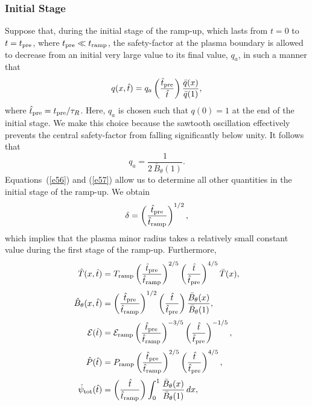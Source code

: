 \documentclass[12pt,prb,aps]{revtex4-1}
\begin{document}
\subsubsection{Initial Stage}\label{init}
Suppose that, during the initial stage of the ramp-up, which lasts from $t=0$ to $t=t_{\rm pre}$, where $t_{\rm pre}\ll t_{\rm ramp}$, 
the safety-factor at the plasma boundary is allowed to decrease from an initial very large value to its final value, $q_a$, in such a manner that
\begin{equation}\label{e57}
q(x,\hat{t}) = q_a\left(\frac{\hat{t}_{\rm pre}}{\hat{t}}\right)\frac{\bar{q}(x)}{\bar{q}(1)},
\end{equation}
where $\hat{t}_{\rm pre}= t_{\rm pre}/\tau_R$. Here, $q_a$ is chosen such that $q(0)=1$ at the end of the initial stage. We make this choice because the
sawtooth oscillation effectively prevents the central safety-factor from falling significantly below unity.\cite{book} It follows that
\begin{equation}
q_a = \frac{1}{2\,\bar{B}_\theta(1)}.
\end{equation}
Equations~(\ref{e56}) and (\ref{e57}) allow us to determine all other quantities in the initial
stage of the ramp-up. We obtain
\begin{equation}
\delta = \left(\frac{\hat{t}_{\rm pre}}{\hat{t}_{\rm ramp}}\right)^{1/2},
\end{equation}
which implies that the plasma minor radius takes a relatively small constant value during the first stage of the ramp-up. 
Furthermore,
\begin{align}
\hat{T}(x,\hat{t}) &= T_{\rm ramp}\left(\frac{\hat{t}_{\rm pre}}{\hat{t}_{\rm ramp}}\right)^{2/5}\left(\frac{\hat{t}}{\hat{t}_{\rm pre}}\right)^{4/5}\bar{T}(x),\\[0.5ex]
\hat{B}_\theta(x,\hat{t})&= \left(\frac{\hat{t}_{\rm pre}}{\hat{t}_{\rm ramp}}\right)^{1/2}\left(\frac{\hat{t}}{\hat{t}_{\rm pre}}\right)\frac{\bar{B}_\theta(x)}{\bar{B}_\theta(1)},\\[0.5ex]
{\cal E}(\hat{t}) &= {\cal E}_{\rm ramp}\left(\frac{\hat{t}_{\rm pre}}{\hat{t}_{\rm ramp}}\right)^{-3/5}\left(\frac{\hat{t}}{\hat{t}_{\rm pre}}\right)^{-1/5},\\[0.5ex]
\hat{P}(\hat{t}) &= P_{\rm ramp}\left(\frac{\hat{t}_{\rm pre}}{\hat{t}_{\rm ramp}}\right)^{2/5}\left(\frac{\hat{t}}{\hat{t}_{\rm pre}}\right)^{4/5},\\[0.5ex]
\hat{\psi}_{\rm tot}(\hat{t})&= \left(\frac{\hat{t}}{\hat{t}_{\rm ramp}}\right)\int_0^1\frac{\bar{B}_{\theta}(x)}{\bar{B}_\theta(1)}\,dx,
\end{align}
\end{document}
